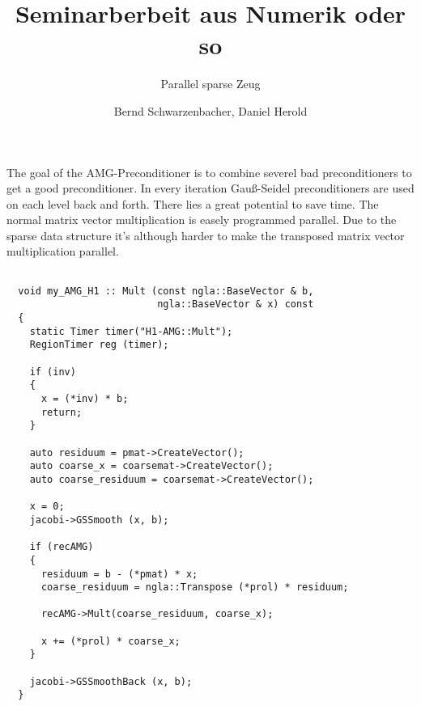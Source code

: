 \documentclass[a4paper,11pt]{article}
\title{Seminarberbeit aus Numerik oder so}
\subtitle{Parallel sparse Zeug}
\author{Bernd Schwarzenbacher, Daniel Herold}
\begin{document}
\maketitle
\tableofcontents

\pagebreak


The goal of the AMG-Preconditioner is to combine severel bad preconditioners to
get a good preconditioner.
In every iteration Gauß-Seidel preconditioners are used on each level back and
forth. There lies a great potential to save time.
The normal matrix vector multiplication is easely programmed parallel. Due to
the sparse data structure it's although harder to make the transposed matrix
vector multiplication parallel.

\begin{lstlisting}

  void my_AMG_H1 :: Mult (const ngla::BaseVector & b,
                          ngla::BaseVector & x) const
  {
    static Timer timer("H1-AMG::Mult");
    RegionTimer reg (timer);

    if (inv)
    {
      x = (*inv) * b;
      return;
    }

    auto residuum = pmat->CreateVector();
    auto coarse_x = coarsemat->CreateVector();
    auto coarse_residuum = coarsemat->CreateVector();

    x = 0;
    jacobi->GSSmooth (x, b);

    if (recAMG)
    {
      residuum = b - (*pmat) * x;
      coarse_residuum = ngla::Transpose (*prol) * residuum;

      recAMG->Mult(coarse_residuum, coarse_x);

      x += (*prol) * coarse_x;
    }

    jacobi->GSSmoothBack (x, b);
  }
\end{lstlisting} 
\end{document}
